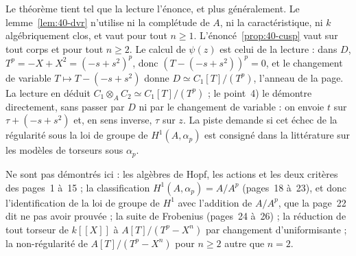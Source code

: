 \begin{remarque}
Le théorème tient tel que la lecture l'énonce, et plus généralement. Le lemme~\ref{lem:40-dvr} n'utilise ni la complétude de $A$, ni la caractéristique, ni $k$ algébriquement clos, et vaut pour tout $n \geq 1$. L'énoncé~\ref{prop:40-cusp} vaut sur tout corps et pour tout $n \geq 2$. Le calcul de $\psi(z)$ est celui de la lecture : dans $D$, $T^p = -X + X^2 = (-s + s^2)^p$, donc $(T - (-s + s^2))^p = 0$, et le changement de variable $T \mapsto T - (-s + s^2)$ donne $D \simeq C_1[T]/(T^p)$, l'anneau de la page. La lecture en déduit $C_1 \otimes_A C_2 \simeq C_1[T]/(T^p)$ ; le point~4) le démontre directement, sans passer par $D$ ni par le changement de variable : on envoie $t$ sur $\tau + (-s + s^2)$ et, en sens inverse, $\tau$ sur $z$. La piste demande si cet échec de la régularité sous la loi de groupe de $H^1(A, \alpha_p)$ est consigné dans la littérature sur les modèles de torseurs sous $\alpha_p$.
\end{remarque}

Ne sont pas démontrés ici : les algèbres de Hopf, les actions et les deux critères des pages~1 à~15 ; la classification $H^1(A, \alpha_p) = A/A^p$ (pages~18 à~23), et donc l'identification de la loi de groupe de $H^1$ avec l'addition de $A/A^p$, que la page~22 dit ne pas avoir prouvée ; la suite de Frobenius (pages~24 à~26) ; la réduction de tout torseur de $k[[X]]$ à $A[T]/(T^p - X^n)$ par changement d'uniformisante ; la non-régularité de $A[T]/(T^p - X^n)$ pour $n \geq 2$ autre que $n = 2$.
